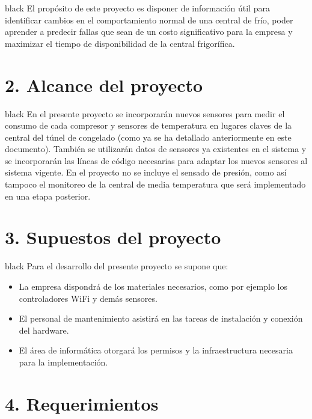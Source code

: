 \documentclass[
11pt, %
]{charter}
\begin{document}
\begin{consigna}{black}
El propósito de este proyecto es disponer de información útil para identificar cambios en el comportamiento normal de una central de frío, poder aprender a predecir fallas que sean de un costo significativo para la empresa y maximizar el tiempo de disponibilidad de la central frigorífica.
\end{consigna}

\section{2. Alcance del proyecto}
\label{sec:alcance}

\begin{consigna}{black}
En el presente proyecto se incorporarán nuevos sensores para medir el consumo de cada compresor y sensores de temperatura en lugares claves de la central del túnel de congelado (como ya se ha detallado anteriormente en este documento). También se utilizarán datos de sensores ya existentes en el sistema y se incorporarán las líneas de código necesarias para adaptar los nuevos sensores al sistema vigente. En el proyecto no se incluye el sensado de presión, como así tampoco el monitoreo de la central de media temperatura que será implementado en una etapa posterior.
\end{consigna}


\section{3. Supuestos del proyecto}
\label{sec:supuestos}

\begin{consigna}{black}
Para el desarrollo del presente proyecto se supone que:
\begin{itemize}
	\item La empresa dispondrá de los materiales necesarios, como por ejemplo los controladores WiFi y demás sensores.
	\item El personal de mantenimiento asistirá en las tareas de instalación y conexión del hardware.
	\item El área de informática otorgará los permisos y la infraestructura necesaria para la implementación.
\end{itemize}
\end{consigna}

\section{4. Requerimientos}
\label{sec:requerimientos}
\end{document}
